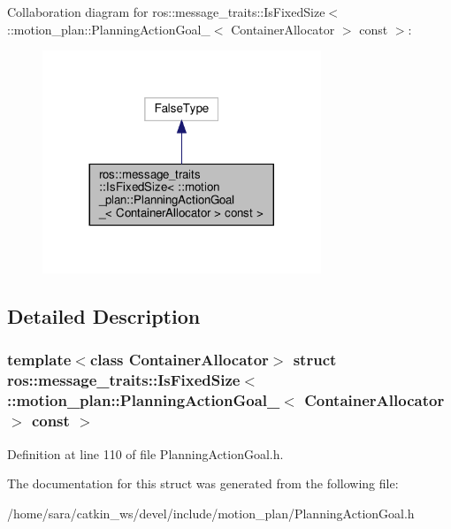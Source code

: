 Collaboration diagram for ros\+:\+:message\+\_\+traits\+:\+:Is\+Fixed\+Size$<$ \+:\+:motion\+\_\+plan\+:\+:Planning\+Action\+Goal\+\_\+$<$ Container\+Allocator $>$ const $>$\+:
\nopagebreak
\begin{figure}[H]
\begin{center}
\leavevmode
\includegraphics[width=236pt]{structros_1_1message__traits_1_1IsFixedSize_3_01_1_1motion__plan_1_1PlanningActionGoal___3_01Cone5a7328f4a806ea02ec369be206b453e}
\end{center}
\end{figure}


\subsection{Detailed Description}
\subsubsection*{template$<$class Container\+Allocator$>$\newline
struct ros\+::message\+\_\+traits\+::\+Is\+Fixed\+Size$<$ \+::motion\+\_\+plan\+::\+Planning\+Action\+Goal\+\_\+$<$ Container\+Allocator $>$ const $>$}



Definition at line 110 of file Planning\+Action\+Goal.\+h.



The documentation for this struct was generated from the following file\+:\begin{DoxyCompactItemize}
\item 
/home/sara/catkin\+\_\+ws/devel/include/motion\+\_\+plan/Planning\+Action\+Goal.\+h\end{DoxyCompactItemize}
